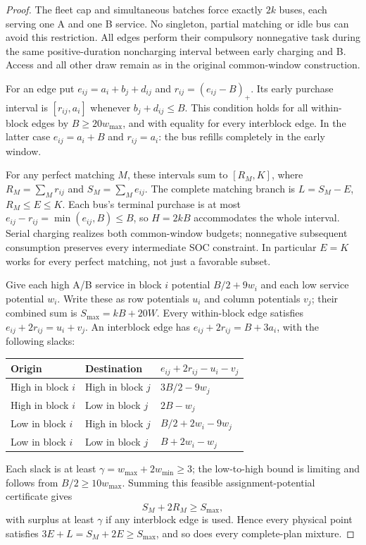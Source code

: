 \begin{proof}
The fleet cap and simultaneous batches force exactly $2k$ buses, each
serving one A and one B service. No singleton, partial matching or idle
bus can avoid this restriction. All edges perform their compulsory
nonnegative task during the same positive-duration noncharging interval
between early charging and B. Access and all other draw remain as in the
original common-window construction.

For an edge put $e_{ij}=a_i+b_j+d_{ij}$ and
$r_{ij}=(e_{ij}-B)_+$. Its early purchase interval is
$[r_{ij},a_i]$ whenever $b_j+d_{ij}\le B$. This condition holds for all
within-block edges by $B\ge20w_{\max}$, and with equality for every
interblock edge. In the latter case $e_{ij}=a_i+B$ and $r_{ij}=a_i$:
the bus refills completely in the early window.

For any perfect matching $M$, these intervals sum to $[R_M,K]$, where
$R_M=\sum_Mr_{ij}$ and $S_M=\sum_Me_{ij}$. The complete matching branch
is $L=S_M-E$, $R_M\le E\le K$. Each bus's terminal purchase is at most
$e_{ij}-r_{ij}=\min(e_{ij},B)\le B$, so $H=2kB$ accommodates the
whole interval. Serial charging realizes both common-window budgets;
nonnegative subsequent consumption preserves every intermediate SOC
constraint. In particular $E=K$ works for every perfect matching, not
just a favorable subset.

Give each high A/B service in block $i$ potential $B/2+9w_i$ and each
low service potential $w_i$. Write these as row potentials $u_i$ and
column potentials $v_j$; their combined sum is $S_{\max}=kB+20W$.
Every within-block edge satisfies
$e_{ij}+2r_{ij}=u_i+v_j$. An interblock edge has
$e_{ij}+2r_{ij}=B+3a_i$, with the following slacks:
\begin{center}
\begin{tabular}{lll}
\toprule
Origin & Destination & $e_{ij}+2r_{ij}-u_i-v_j$\\
\midrule
High in block $i$ & High in block $j$ & $3B/2-9w_j$\\
High in block $i$ & Low in block $j$ & $2B-w_j$\\
Low in block $i$ & High in block $j$ & $B/2+2w_i-9w_j$\\
Low in block $i$ & Low in block $j$ & $B+2w_i-w_j$\\
\bottomrule
\end{tabular}
\end{center}
Each slack is at least $\gamma=w_{\max}+2w_{\min}\ge3$; the
low-to-high bound is limiting and follows from $B/2\ge10w_{\max}$.
Summing this feasible assignment-potential certificate gives
\[
 S_M+2R_M\ge S_{\max},
\]
with surplus at least $\gamma$ if any interblock edge is used. Hence
every physical point satisfies
$3E+L=S_M+2E\ge S_{\max}$, and so does every complete-plan mixture.


\end{proof}
